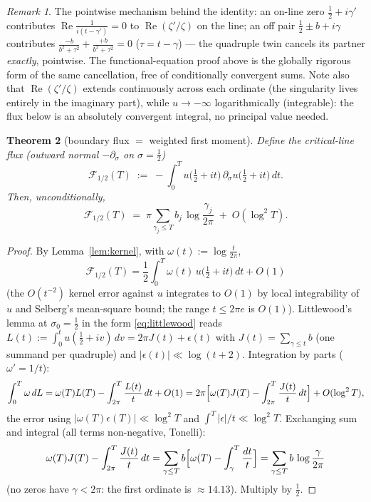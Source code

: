 \documentclass[11pt]{amsart}
\theoremstyle{plain}
\newtheorem{theorem}{Theorem}[section]
\theoremstyle{definition}
\theoremstyle{remark}
\newtheorem{remark}[theorem]{Remark}
\renewcommand{\Re}{\operatorname{Re}}
\begin{document}
\begin{remark}
The pointwise mechanism behind the identity: an on-line zero $\tfrac12+i\gamma'$ contributes $\Re\frac1{i(t-\gamma')}=0$ to $\Re(\zeta'/\zeta)$ on the line; an off pair $\tfrac12\pm b+i\gamma$ contributes $\frac{-b}{b^2+\tau^2}+\frac{+b}{b^2+\tau^2}=0$ ($\tau=t-\gamma$) --- the quadruple twin cancels its partner \emph{exactly}, pointwise. The functional-equation proof above is the globally rigorous form of the same cancellation, free of conditionally convergent sums. Note also that $\Re(\zeta'/\zeta)$ extends continuously across each ordinate (the singularity lives entirely in the imaginary part), while $u\to-\infty$ logarithmically (integrable): the flux below is an absolutely convergent integral, no principal value needed.
\end{remark}

\begin{theorem}[boundary flux $=$ weighted first moment]\label{thm:flux}
Define the critical-line flux \textup{(}outward normal $-\partial_\sigma$ on $\sigma=\tfrac12$\textup{)}
\[
\mathcal F_{1/2}(T)\;:=\;-\int_0^T u\bigl(\tfrac12+it\bigr)\,\partial_\sigma u\bigl(\tfrac12+it\bigr)\,dt .
\]
Then, unconditionally,
\[
\mathcal F_{1/2}(T)\;=\;\pi\sum_{\gamma_j\le T} b_j\,\log\frac{\gamma_j}{2\pi}\;+\;O(\log^2 T).
\]
\end{theorem}

\begin{proof}
By Lemma~\ref{lem:kernel}, with $\omega(t):=\log\frac t{2\pi}$,
\[
\mathcal F_{1/2}(T)=\frac12\int_0^T\omega(t)\,u\bigl(\tfrac12+it\bigr)\,dt+O(1)
\]
(the $O(t^{-2})$ kernel error against $u$ integrates to $O(1)$ by local integrability of $u$ and Selberg's mean-square bound; the range $t\le2\pi e$ is $O(1)$). Littlewood's lemma at $\sigma_0=\tfrac12$ in the form \eqref{eq:littlewood} reads $L(t):=\int_0^t u(\tfrac12+iv)\,dv=2\pi J(t)+\epsilon(t)$ with $J(t)=\sum_{\gamma\le t}b$ (one summand per quadruple) and $|\epsilon(t)|\ll\log(t+2)$. Integration by parts ($\omega'=1/t$):
\[
\int_0^T\omega\,dL
=\omega(T)L(T)-\int_{2\pi}^T\frac{L(t)}{t}\,dt+O(1)
=2\pi\Bigl[\omega(T)J(T)-\int_{2\pi}^T\frac{J(t)}{t}\,dt\Bigr]+O(\log^2T),
\]
the error using $|\omega(T)\epsilon(T)|\ll\log^2T$ and $\int^T|\epsilon|/t\ll\log^2T$. Exchanging sum and integral (all terms non-negative, Tonelli):
\[
\omega(T)J(T)-\int_{2\pi}^T\frac{J(t)}{t}\,dt
=\sum_{\gamma\le T}b\Bigl[\omega(T)-\int_{\gamma}^T\frac{dt}{t}\Bigr]
=\sum_{\gamma\le T}b\,\log\frac{\gamma}{2\pi}
\]
(no zeros have $\gamma<2\pi$: the first ordinate is $\approx14.13$). Multiply by $\tfrac12$.
\end{proof}
\end{document}
